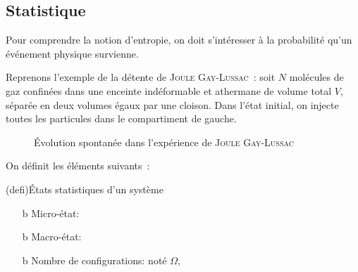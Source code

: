 \documentclass[../../main/main.tex]{subfiles}
\begin{document}
\subsection{Statistique}
Pour comprendre la notion d'entropie, on doit s'intéresser à la probabilité
qu'un événement physique survienne.

Reprenons l'exemple de la détente de \textsc{Joule Gay-Lussac}~:
soit $N$ molécules de gaz confinées dans une enceinte indéformable et athermane
de volume total $V$, séparée en deux volumes égaux par une cloison. Dans l'état
initial, on injecte toutes les particules dans le compartiment de gauche.

\begin{figure}[htbp!]
	\caption{Évolution spontanée dans l'expérience de \textsc{Joule Gay-Lussac}}
\end{figure}

On définit les éléments suivants~:
\begin{tcb}(defi){États statistiques d'un système}
	\begin{itemize}
		\item[b]{Micro-état}: 
		\item[b]{Macro-état}: 
		\item[b]{Nombre de configurations}: noté $\Omega$, 
	\end{itemize}
\end{tcb}
\end{document}
